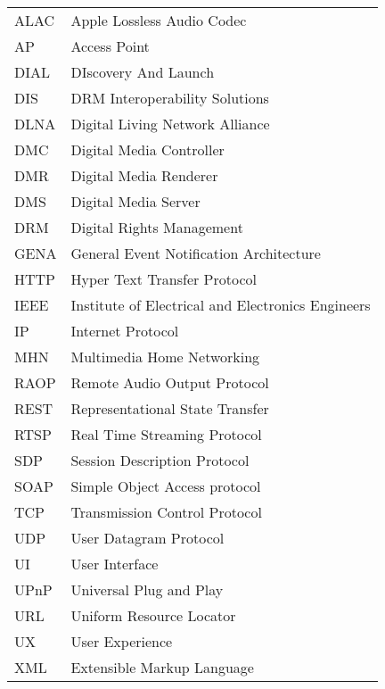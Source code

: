 



\begin{tabular}{ll}
ALAC	& Apple Lossless Audio Codec \\
AP	   & Access Point \\
DIAL	   & DIscovery And Launch \label{dial_shortfor} \\
DIS		& DRM Interoperability Solutions\\
DLNA       & Digital Living Network Alliance\label{dlna_shortfor} \\ 
DMC        & Digital Media Controller \\
DMR        & Digital Media Renderer \\
DMS        & Digital Media Server \\
DRM        & Digital Rights Management \\ 
GENA		& General Event Notification Architecture\\
HTTP       & Hyper Text Transfer Protocol \\
IEEE		& Institute of Electrical and Electronics Engineers \\
IP		& Internet Protocol \\
MHN		 & Multimedia Home Networking \\
RAOP	   & Remote Audio Output Protocol\\
REST		& Representational State Transfer\\
RTSP       & Real Time Streaming Protocol \\
SDP    	& Session Description Protocol\\ 
SOAP		& Simple Object Access protocol\\
TCP		& Transmission Control Protocol \\
UDP		& User Datagram Protocol \\
UI		& User Interface \\
UPnP	   & Universal Plug and Play \label{upnp_shortfor} \\
URL		& Uniform Resource Locator \\
UX		& User Experience \\
XML		& Extensible Markup Language \\

\end{tabular}
